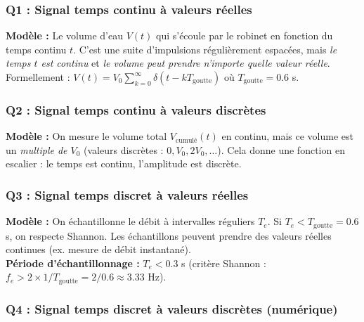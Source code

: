 \documentclass[12pt,a4paper]{article}
\begin{document}
\subsubsection*{Q1 : Signal temps continu à valeurs réelles}

\begin{tcolorbox}[corrbox, title=Correction Q1]
\textbf{Modèle :} Le volume d'eau $V(t)$ qui s'écoule par le robinet en fonction du temps continu $t$.
C'est une suite d'impulsions régulièrement espacées, mais \textit{le temps $t$ est continu}
et \textit{le volume peut prendre n'importe quelle valeur réelle}.\\[3pt]
Formellement : $V(t) = V_0 \sum_{k=0}^{\infty} \delta(t - kT_{\text{goutte}})$
où $T_{\text{goutte}} = 0.6$ s.
\end{tcolorbox}

\subsubsection*{Q2 : Signal temps continu à valeurs discrètes}

\begin{tcolorbox}[corrbox, title=Correction Q2]
\textbf{Modèle :} On mesure le volume total $V_{\text{cumulé}}(t)$ en continu, mais ce volume
est un \textit{multiple de $V_0$} (valeurs discrètes : $0, V_0, 2V_0, \ldots$).
Cela donne une fonction en escalier : le temps est continu, l'amplitude est discrète.
\end{tcolorbox}

\subsubsection*{Q3 : Signal temps discret à valeurs réelles}

\begin{tcolorbox}[corrbox, title=Correction Q3]
\textbf{Modèle :} On échantillonne le débit à intervalles réguliers $T_e$.
Si $T_e < T_{\text{goutte}} = 0.6$ s, on respecte Shannon.
Les échantillons peuvent prendre des valeurs réelles continues (ex. mesure de débit instantané).\\[3pt]
\textbf{Période d'échantillonnage :} $T_e < 0.3$ s
(critère Shannon : $f_e > 2 \times 1/T_{\text{goutte}} = 2/0.6 \approx 3.33$ Hz).
\end{tcolorbox}

\subsubsection*{Q4 : Signal temps discret à valeurs discrètes (numérique)}
\end{document}
